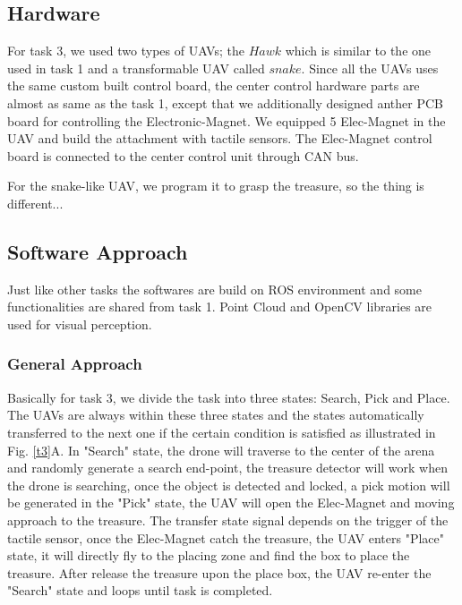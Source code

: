 \documentclass{standalone}
\begin{document}
\subsection{Hardware}
For task 3, we used two types of UAVs; the $Hawk$ which is similar to the one used in task 1 and a transformable UAV called $snake$.
Since all the UAVs uses the same custom built control board, the center control hardware parts are almost as same as the task 1, except that we additionally designed anther PCB board for controlling the Electronic-Magnet. We equipped 5 Elec-Magnet in the UAV and build the attachment with tactile sensors. The Elec-Magnet control board is connected to the center control unit through CAN bus.

For the snake-like UAV, we program it to grasp the treasure, so the thing is different...

\subsection{Software Approach}
Just like other tasks the softwares are build on ROS environment and some functionalities are shared from task 1. Point Cloud and OpenCV libraries are used for visual perception. %

\subsubsection{General Approach}
Basically for task 3, we divide the task into three states: Search, Pick and Place. The UAVs are always within these three states and the states automatically transferred to the next one if the certain condition is satisfied as illustrated in Fig. \ref{t3}A. In "Search" state, the drone will traverse to the center of the arena and randomly generate a search end-point, the treasure detector will work when the drone is searching, once the object is detected and locked, a pick motion will be generated in the "Pick" state, the UAV will open the Elec-Magnet and moving approach to the treasure. The transfer state signal depends on the trigger of the tactile sensor, once the Elec-Magnet catch the treasure, the UAV enters "Place" state, it will directly fly to the placing zone and find the box to place the treasure. After release the treasure upon the place box, the UAV re-enter the "Search" state and loops until task is completed.
\end{document}
